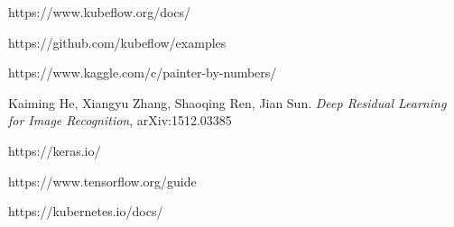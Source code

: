 \documentclass[
	12pt, %
]{fphw}
\begin{document}
\begin{thebibliography}{7}

https://www.kubeflow.org/docs/

https://github.com/kubeflow/examples

https://www.kaggle.com/c/painter-by-numbers/

Kaiming He, Xiangyu Zhang, Shaoqing Ren, Jian Sun. \textit{Deep Residual Learning for Image Recognition}, arXiv:1512.03385

https://keras.io/

https://www.tensorflow.org/guide

https://kubernetes.io/docs/

 
\end{thebibliography}
\end{document}
